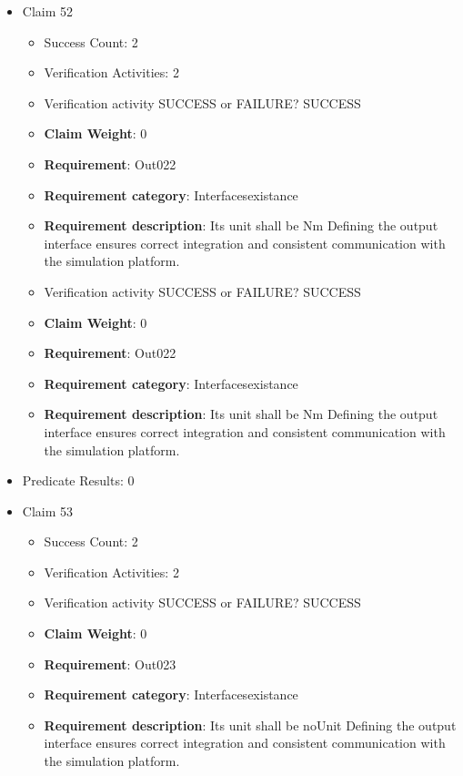\documentclass{article}
\begin{document}
\begin{itemize}
  				  \item Claim 52
				\begin{itemize}
			    	\item Success Count: 2 
			    	\item Verification Activities: 2
					\item Verification activity SUCCESS or FAILURE? SUCCESS
					\item \textbf{Claim Weight}: 0
						\item \textbf{Requirement}: Out022 
						\item \textbf{Requirement category}: Interfacesexistance 
						\item \textbf{Requirement description}: Its unit shall be Nm Defining the output interface ensures correct integration and consistent communication with the simulation platform.
					
					\item Verification activity SUCCESS or FAILURE? SUCCESS
					\item \textbf{Claim Weight}: 0
						\item \textbf{Requirement}: Out022 
						\item \textbf{Requirement category}: Interfacesexistance 
						\item \textbf{Requirement description}: Its unit shall be Nm Defining the output interface ensures correct integration and consistent communication with the simulation platform.
					
				\end{itemize}
				
									    
				\item Predicate Results: 0

  				  \item Claim 53
				\begin{itemize}
			    	\item Success Count: 2 
			    	\item Verification Activities: 2
					\item Verification activity SUCCESS or FAILURE? SUCCESS
					\item \textbf{Claim Weight}: 0
						\item \textbf{Requirement}: Out023 
						\item \textbf{Requirement category}: Interfacesexistance 
						\item \textbf{Requirement description}: Its unit shall be noUnit Defining the output interface ensures correct integration and consistent communication with the simulation platform.
					

\end{itemize}
\end{itemize}
\end{document}
